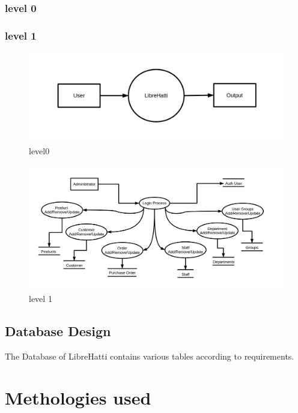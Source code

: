 \documentclass[12pt]{article}
\begin{document}
\begin{enumerate}
\subsubsection{level 0}
\subsubsection{level 1}
\begin{figure}[!h]
\centering
\includegraphics[width=120mm]{images/level0.png}
\caption{level0}
\end{figure}


\begin{figure}[!h]
\centering
\includegraphics[width=130mm]{images/level1.png}
\caption{level 1}
\end{figure} 
\subsection{Database Design}
The Database of LibreHatti contains various tables according to requirements.
\section{Methologies used }

\end{enumerate}
\end{document}
